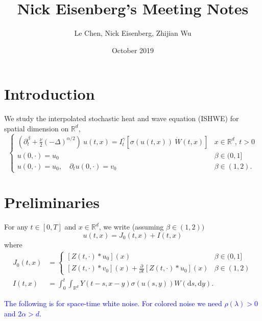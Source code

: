 \documentclass[a4paper,11pt]{article}
\title{Nick Eisenberg's Meeting Notes}
\author{Le Chen, Nick Eisenberg, Zhijian Wu}
\date{October 2019}
\numberwithin{equation}{section}
\theoremstyle{plain}
\theoremstyle{definition}
\newcommand{\ud}{\ensuremath{\mathrm{d} }}
\newcommand{\R}{\mathbb{R}}
\numberwithin{NQ}{section}
\numberwithin{LQ}{section}
\numberwithin{ZQ}{section}
\begin{document}
	\section{Introduction}
	We study the interpolated stochastic heat and wave equation (ISHWE) for spatial dimension on $\R^d$,
	\begin{equation}
	\label{E:SPDE}
	\begin{cases}
	\left(\partial^\beta_t + \frac{\nu}{2}(-\Delta)^{\alpha/2}\right)\: u(t,x) = I^\gamma_t \left[\sigma( u(t,x)) \: \dot W(t,x) \right] & \text{$x\in \R^d$, $t>0$} \\
	u(0,\cdot) = u_0                                                                                                            & \beta \in (0,1]               \\
	u(0,\cdot) = u_0, \quad \partial_t u(0,\cdot) = v_0                                                                            & \beta \in (1,2).
	\end{cases}
	\end{equation}
	
	
	\section{Preliminaries}
	For any $t \in [0,T]$ and $x \in \R^d$, we write (assuming $\beta \in (1,2))$
	\[
	u(t,x) = J_0(t,x) + I(t,x)
	\]
	where
	\begin{align*}
	J_0(t,x) &=\begin{cases} 
	[Z(t,\cdot)*u_0](x) & \beta \in (0,1]
	\\	[Z(t,\cdot)*v_0](x) + \frac{\partial}{\partial t}[Z(t,\cdot)*u_0](x) & \beta \in (1,2)
	\end{cases}
	\\	I(t,x) &= \int_0^t \int_{\R^d} Y(t-s,x-y)\sigma(u(s,y)) W(\ud s, \ud y).
	\end{align*}
	
	\textcolor{blue}{The following is for space-time white noise. For colored noise we need $\rho(\lambda) >0$ and $2\alpha > d$.}
	
\end{document}
